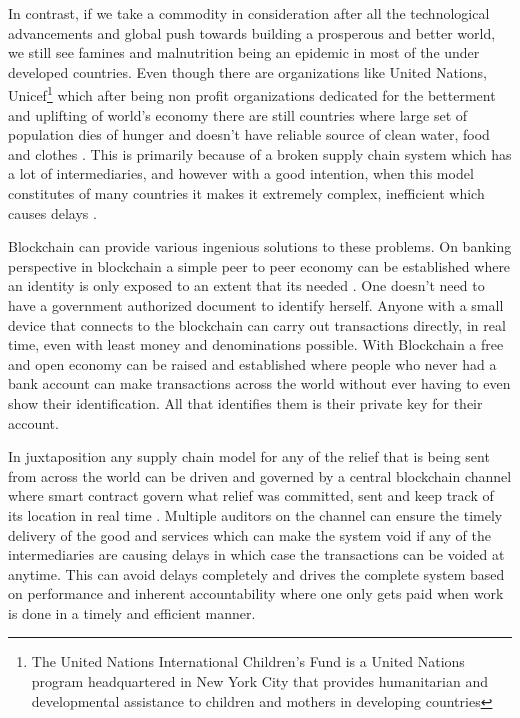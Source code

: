 In contrast, if we take a commodity in consideration after all the technological advancements and global push towards building a prosperous and better world, we still see famines and malnutrition being an epidemic in most of the under developed countries. Even though there are organizations like United Nations, Unicef\footnote{The United Nations International Children's Fund is a United Nations program headquartered in New York City that provides humanitarian and developmental assistance to children and mothers in developing countries} which after being non profit organizations dedicated for the betterment and uplifting of world's economy there are still countries where large set of population dies of hunger and doesn't have reliable source of clean water, food and clothes \cite{bbc16}. This is primarily because of a broken supply chain system which has a lot of intermediaries, and however with a good intention, when this model constitutes of many countries it makes it extremely complex, inefficient which causes delays \cite{van16}.


Blockchain can provide various ingenious solutions to these problems. On banking perspective in blockchain a simple peer to peer economy can be established where an identity is only exposed to an extent that its needed \cite{yli18}. One doesn't need to have a government authorized document to identify herself. Anyone with a small device that connects to the blockchain can carry out transactions directly, in real time, even with least money and denominations possible. With Blockchain a free and open economy can be raised and established where people who never had a bank account can make transactions across the world without ever having to even show their identification. All that identifies them is their private key for their account.

In juxtaposition any supply chain model for any of the relief that is being sent from across the world can be driven and governed by a central blockchain channel where smart contract govern what relief was committed, sent and keep track of its location in real time \cite{christ19}. Multiple auditors on the channel can ensure the timely delivery of the good and services which can make the system void if any of the intermediaries are causing delays in which case the transactions can be voided at anytime. This can avoid delays completely and drives the complete system based on performance and inherent accountability where one only gets paid  when work is done in a timely and efficient manner.

